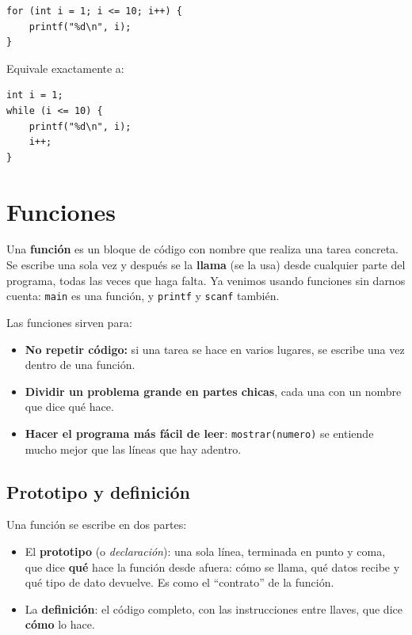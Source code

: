 \begin{lstlisting}[style=estilo-c]
for (int i = 1; i <= 10; i++) {
    printf("%d\n", i);
}
\end{lstlisting}

Equivale exactamente a:

\begin{lstlisting}[style=estilo-c]
int i = 1;
while (i <= 10) {
    printf("%d\n", i);
    i++;
}
\end{lstlisting}

\section{Funciones}

Una \textbf{función} es un bloque de código con nombre que realiza una tarea concreta. Se escribe una sola vez y después se la \textbf{llama} (se la usa) desde cualquier parte del programa, todas las veces que haga falta. Ya venimos usando funciones sin darnos cuenta: \texttt{main} es una función, y \texttt{printf} y \texttt{scanf} también.

Las funciones sirven para:
\begin{itemize}
  \item \textbf{No repetir código:} si una tarea se hace en varios lugares, se escribe una vez dentro de una función.
  \item \textbf{Dividir un problema grande en partes chicas}, cada una con un nombre que dice qué hace.
  \item \textbf{Hacer el programa más fácil de leer}: \texttt{mostrar(numero)} se entiende mucho mejor que las líneas que hay adentro.
\end{itemize}

\subsection{Prototipo y definición}

Una función se escribe en dos partes:

\begin{itemize}
  \item El \textbf{prototipo} (o \emph{declaración}): una sola línea, terminada en punto y coma, que dice \textbf{qué} hace la función desde afuera: cómo se llama, qué datos recibe y qué tipo de dato devuelve. Es como el ``contrato'' de la función.
  \item La \textbf{definición}: el código completo, con las instrucciones entre llaves, que dice \textbf{cómo} lo hace.
\end{itemize}

